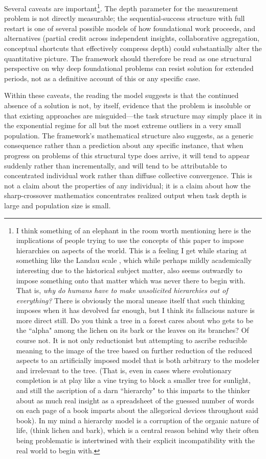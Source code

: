 \documentclass{article}
\begin{document}
Several caveats are important\footnote{I think something of an elephant in the room worth mentioning here is the implications of people trying to use the concepts of this paper to impose hierarchies on aspects of the world. This is a feeling I get while staring at something like the Landau scale \cite{mermin1984homage}, which while perhaps mildly academically interesting due to the historical subject matter, also seems outwardly to impose something onto that matter which was never there to begin with. That is, \emph{why do humans have to make unsolicited hierarchies out of everything?} There is obviously the moral unease itself that such thinking imposes when it has devolved far enough, but I think its fallacious nature is more direct still.
Do you think a tree in a forest cares about who gets to be the ``alpha" among the lichen on its bark or the leaves on its branches? Of course not. It is not only reductionist but attempting to ascribe reducible meaning to the image of the tree based on further reduction of the reduced aspects to an artificially imposed model that is both arbitrary to the modeler and irrelevant to the tree. (That is, even in cases where evolutionary completion is at play like a vine trying to block a smaller tree for sunlight, and still the ascription of a darn ``hierarchy" to this imparts to the thinker about as much real insight as a spreadsheet of the guessed number of words on each page of a book imparts about the allegorical devices throughout said book).
In my mind a hierarchy model is a corruption of the organic nature of life, (think lichen and bark), which is a central reason behind why their often being problematic is intertwined with their explicit incompatibility with the real world to begin with.}. The depth parameter for the measurement
problem is not directly measurable; the sequential-success structure
with full restart is one of several possible models of how foundational
work proceeds, and alternatives (partial credit across independent
insights, collaborative aggregation, conceptual shortcuts that
effectively compress depth) could substantially alter the quantitative
picture. The framework should therefore be read as one structural
perspective on why deep foundational problems can resist solution for
extended periods, not as a definitive account of this or any specific
case.

Within these caveats, the reading the model suggests is that the
continued absence of a solution is not, by itself, evidence that the
problem is insoluble or that existing approaches are misguided---the
task structure may simply place it in the exponential regime for all
but the most extreme outliers in a very small population. The
framework's mathematical structure also suggests, as a generic
consequence rather than a prediction about any specific instance, that
when progress on problems of this structural type does arrive, it will
tend to appear suddenly rather than incrementally, and will tend to be
attributable to concentrated individual work rather than diffuse
collective convergence. This is not a claim about the properties of any
individual; it is a claim about how the sharp-crossover mathematics concentrates realized output when task depth is large and population
size is small.
\end{document}

